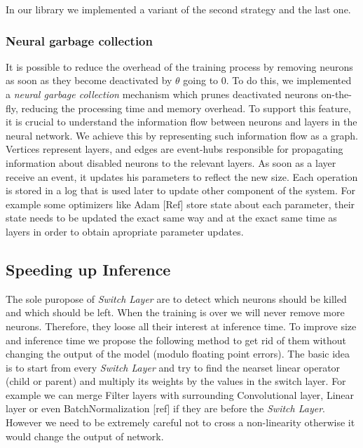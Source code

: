 In our library we implemented a variant of the second strategy and the last one.

\subsubsection{Neural garbage collection}

It is possible to reduce the overhead of the training process by removing
neurons as soon as they become deactivated by $\theta$ going to 0.
To do this, we implemented a \emph{neural garbage collection} mechanism which
prunes deactivated neurons on-the-fly,  reducing the processing time
and memory overhead. To support this feature, it is crucial to understand the
information flow between neurons and layers in the neural network. We achieve
this by representing such information flow as a graph. Vertices represent layers,
and edges are event-hubs responsible for propagating information about disabled
neurons to the relevant layers. As soon as a layer receive an event, it updates
his parameters to reflect the new size. Each operation is stored in a log that
is used later to update other component of the system. For example some
optimizers like Adam [Ref] store state about each parameter, their state needs
to be updated the exact same way and at the exact same time as layers in order
to obtain apropriate parameter updates.

\subsection{Speeding up Inference}

The sole puropose of \textit{Switch Layer} are to detect which neurons should be
killed and which should be left. When the training is over we will never remove
more neurons. Therefore, they loose all their interest at inference time. To
improve size and inference time we propose the following method to get rid of
them without changing the output of the model (modulo floating point errors).
The basic idea is to start from every \textit{Switch Layer} and try to find the
nearset linear operator (child or parent) and multiply its weights by the values
in the switch layer. For example we can merge Filter layers with surrounding
Convolutional layer, Linear layer or even BatchNormalization [ref] if they are
before the \textit{Switch Layer}. However we need to be extremely careful not to
cross a non-linearity otherwise it would change the output of network.